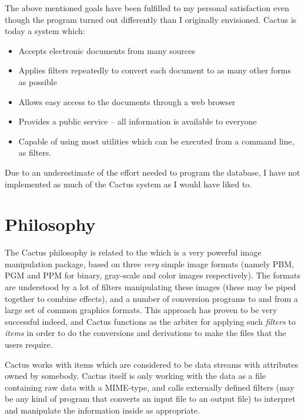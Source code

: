 The above mentioned goals have been fulfilled to my
personal satisfaction even though the program turned out
differently than I originally envisioned. Cactus is today a
system which:

\begin{itemize}
  
\item Accepts electronic documents from many sources
  
\item Applies filters repeatedly to convert each document to
  as many other forms as possible
  
\item Allows easy access to the documents through a web
  browser
  
\item Provides a public service -- all information is
  available to everyone
  

\item Capable of using most utilities which can be executed from a
  command line, as filters.
\end{itemize}

Due to an underestimate of the effort needed to program the
database, I have not implemented as much of
the Cactus system as I would have liked to.  

\section{Philosophy}
\label{sec:cactus-philosophy}

The Cactus philosophy is related to the
 which is a very
powerful image manipulation package, based on three
\textit{very} simple image formats (namely PBM, PGM and PPM
for binary, gray-scale and color images respectively).  The
formats are understood by a lot of filters manipulating
these images (these may be piped together to combine
effects), and a number of conversion programs to and from a
large set of common graphics formats.  This approach has
proven to be very successful indeed, and Cactus functions as
the arbiter for applying such \textit{filters} to
\textit{items} in order to do the conversions and
derivations to make the files that the users require.

Cactus works with items which are considered to be data
streams with attributes owned by somebody.  Cactus itself is
only working with the data as a file containing raw data
with a MIME-type, and calls externally defined filters (may
be any kind of program that converts an input file to an
output file) to interpret and manipulate the information
inside as appropriate.


